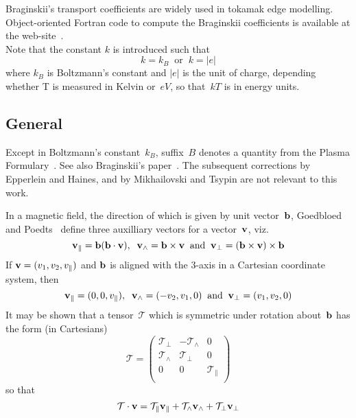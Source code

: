 Braginskii's transport coefficients are widely used in tokamak edge modelling.
Object-oriented Fortran code to compute the Braginskii coefficients is available
at the web-site~\cite{miscwebsite}.\\
Note that the constant $k$ is introduced such that
\begin{equation}
k= k_B\;\;\mbox{or}\;\;k=|e|
\end{equation}
where $k_B$ is Boltzmann's constant and $|e|$ is the unit of charge,
depending whether T is measured in Kelvin or~$eV$, so that~$kT$ is in energy units. 

\subsection{General}\label{sec:general}
Except in Boltzmann's constant~$k_B$, suffix~$B$ denotes a quantity
from the Plasma Formulary~\cite{NRLpf07}. See also Braginskii's paper~\cite{Br65Tranwarv}.
The subsequent corrections by Epperlein and Haines, and by Mikhailovski and Tsypin are not relevant to this work.

In a magnetic field, the direction of which is given by unit vector~${\bf b}$,
Goedbloed and Poedts~\cite{goedbloedpoedts} define three auxilliary vectors for
a vector~${\bf v}$, viz.
\begin{equation}\label{eq:vaux}
{\bf v}_{\|}= {\bf b} ({\bf b} \cdot {\bf v}), \;\; {\bf v}_\wedge= {\bf b} \times {\bf v}
\;\;\mbox{and}\;\; {\bf v}_\perp=({\bf b} \times {\bf v} ) \times {\bf b}
\end{equation}
If ${\bf v} = (v_1, v_2, v_\|)$ and ${\bf b}$ is aligned with the 3-axis
in a Cartesian coordinate system, then
\begin{equation}\label{eq:vpt}
{\bf v}_{\|}= (0,0,v_\|), \;\; {\bf v}_\wedge= (-v_2,v_1,0)
\;\;\mbox{and}\;\; {\bf v}_\perp=(v_1,v_2,0)
\end{equation}
It may be shown that a tensor~$\mathcal{T}$ which is symmetric under rotation
about~${\bf b}$ has the form (in Cartesians) 
\begin{equation}\label{eq:tensor}
\mathcal{T}=
\begin{pmatrix} \mathcal{T}_\perp & - \mathcal{T}_\wedge & 0 \\
 \mathcal{T}_\wedge &  \mathcal{T}_\perp & 0 \\
 0 & 0 & \mathcal{T}_\| \\
\end{pmatrix}
\end{equation}
so that
\begin{equation}\label{eq:TV}
\mathcal{T} \cdot {\bf v} = \mathcal{T}_\| {\bf v}_\| + \mathcal{T}_\wedge {\bf v}_\wedge + \mathcal{T}_\perp {\bf v}_\perp
\end{equation}

